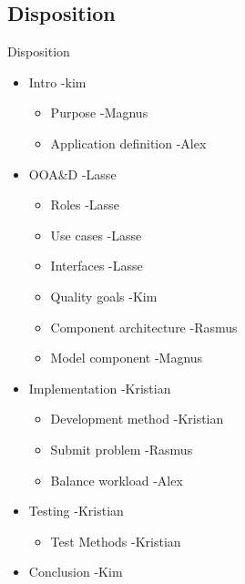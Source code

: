 \subsection*{Disposition}
\begin{frame}{Disposition}
\begin{itemize}
	
	
	\item Intro -kim
	\begin{itemize}
		\item Purpose -Magnus 
		\item Application definition -Alex
	\end{itemize}
	\item OOA&D -Lasse
	\begin{itemize}
		\item Roles -Lasse
		\item Use cases -Lasse
		\item Interfaces -Lasse
		\item Quality goals -Kim
		\item Component architecture -Rasmus
		\item Model component	-Magnus
	\end{itemize}
	\item Implementation -Kristian
	\begin{itemize}
		\item Development method -Kristian
		\item Submit problem -Rasmus
		\item Balance workload -Alex
	\end{itemize}	
	\item Testing -Kristian
	\begin{itemize}
		\item Test Methods -Kristian
	\end{itemize}
	\item Conclusion -Kim
\end{itemize}
\end{frame}